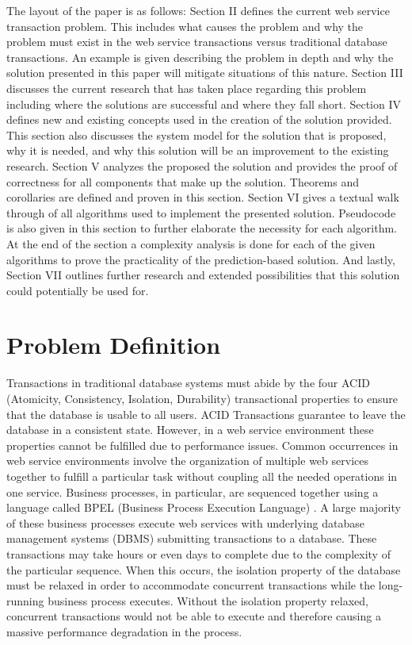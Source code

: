 \documentclass[conference]{IEEEtran}
\begin{document}
The layout of the paper is as follows: Section II defines the current web service transaction problem. This includes what causes the problem and why the problem must exist in the web service transactions versus traditional database transactions. An example is given describing the problem in depth and why the solution presented in this paper will mitigate situations of this nature. Section III discusses the current research that has taken place regarding this problem including where the solutions are successful and where they fall short. Section IV defines new and existing concepts used in the creation of the solution provided. This section also discusses the system model for the solution that is proposed, why it is needed, and why this solution will be an improvement to the existing research. Section V analyzes the proposed the solution and provides the proof of correctness for all components that make up the solution. Theorems and corollaries are defined and proven in this section. Section VI gives a textual walk through of all algorithms used to implement the presented solution. Pseudocode is also given in this section to further elaborate the necessity for each algorithm. At the end of the section a complexity analysis is done for each of the given algorithms to prove the practicality of the prediction-based solution. And lastly, Section VII outlines further research and extended possibilities that this solution could potentially be used for.

\section{Problem Definition}
Transactions in traditional database systems must abide by the four ACID (Atomicity, Consistency, Isolation, Durability) transactional properties to ensure that the database is usable to all users. ACID Transactions guarantee to leave the database in a consistent state. However, in a web service environment these properties cannot be fulfilled due to performance issues. Common occurrences in web service environments involve the organization of multiple web services together to fulfill a particular task without coupling all the needed operations in one service. Business processes, in particular, are sequenced together using a language called BPEL (Business Process Execution Language) \cite{BPEL}. A large majority of these business processes execute web services with underlying database management systems (DBMS) submitting transactions to a database. These transactions may take hours or even days to complete due to the complexity of the particular sequence. When this occurs, the isolation property of the database must be relaxed in order to accommodate concurrent transactions while the long-running business process executes. Without the isolation property relaxed, concurrent transactions would not be able to execute and therefore causing a massive performance degradation in the process.
\end{document}
